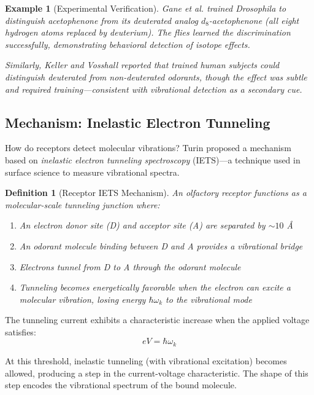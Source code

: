 \documentclass[12pt,a4paper]{article}
\newtheorem{definition}{Definition}
\newtheorem{example}{Example}
\begin{document}
\begin{example}[Experimental Verification]
Gane et al. \cite{gane2013molecular} trained \textit{Drosophila} to distinguish acetophenone from its deuterated analog $d_8$-acetophenone (all eight hydrogen atoms replaced by deuterium). The flies learned the discrimination successfully, demonstrating behavioral detection of isotope effects.

Similarly, Keller and Vosshall \cite{keller2004human} reported that trained human subjects could distinguish deuterated from non-deuterated odorants, though the effect was subtle and required training—consistent with vibrational detection as a secondary cue.
\end{example}

\subsection{Mechanism: Inelastic Electron Tunneling}

How do receptors detect molecular vibrations? Turin proposed a mechanism based on \textit{inelastic electron tunneling spectroscopy} (IETS)—a technique used in surface science to measure vibrational spectra.

\begin{definition}[Receptor IETS Mechanism]
\label{def:ietsp}
An olfactory receptor functions as a molecular-scale tunneling junction where:
\begin{enumerate}
\item An electron donor site (D) and acceptor site (A) are separated by $\sim 10$ Å
\item An odorant molecule binding between D and A provides a vibrational bridge
\item Electrons tunnel from D to A through the odorant molecule
\item Tunneling becomes energetically favorable when the electron can excite a molecular vibration, losing energy $\hbar\omega_k$ to the vibrational mode
\end{enumerate}
\end{definition}

The tunneling current exhibits a characteristic increase when the applied voltage satisfies:
\begin{equation}
eV = \hbar\omega_k
\end{equation}

At this threshold, inelastic tunneling (with vibrational excitation) becomes allowed, producing a step in the current-voltage characteristic. The shape of this step encodes the vibrational spectrum of the bound molecule.
\end{document}
